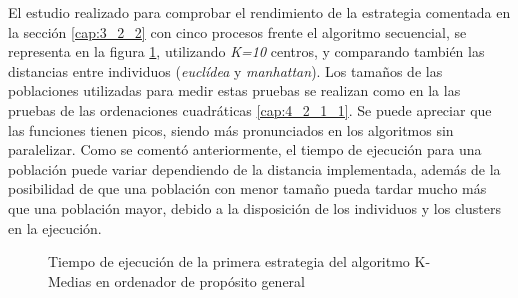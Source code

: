 		El estudio realizado para comprobar el rendimiento de la estrategia comentada en la sección \ref{cap:3_2_2} con cinco procesos frente el algoritmo secuencial, se representa en la figura \ref{fig:KMedias}, utilizando \textit{K=10} centros, y comparando también las distancias entre individuos (\textit{euclídea} y \textit{manhattan}). Los tamaños de las poblaciones utilizadas para medir estas pruebas se realizan como en la las pruebas de las ordenaciones cuadráticas \ref{cap:4_2_1_1}. Se puede apreciar que las funciones tienen picos, siendo más pronunciados en los algoritmos sin paralelizar. Como se comentó anteriormente, el tiempo de ejecución para una población puede variar dependiendo de la distancia implementada, además de la posibilidad de que una población con menor tamaño pueda tardar mucho más que una población mayor, debido a la disposición de los individuos y los clusters en la ejecución. 						
	
	
			\begin{figure}[!h]
			\centering
			\caption{Tiempo de ejecución de la primera estrategia del algoritmo K-Medias en ordenador de propósito general}
			\label{fig:KMedias}
			\end{figure}
			
